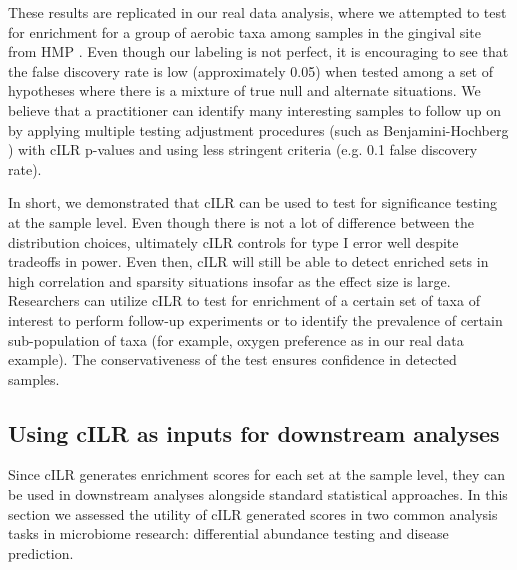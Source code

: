 \documentclass{article}
\begin{document}
These results are replicated in our real data analysis, where we attempted to test for enrichment for a group of aerobic taxa among samples in the gingival site from HMP \cite{consortium2012}. Even though our labeling is not perfect, it is encouraging to see that the false discovery rate is low (approximately 0.05) when tested among a set of hypotheses where there is a mixture of true null and alternate situations. We believe that a practitioner can identify many interesting samples to follow up on by applying multiple testing adjustment procedures (such as Benjamini-Hochberg \cite{benjamini1995}) with cILR p-values and using less stringent criteria (e.g. 0.1 false discovery rate).  

In short, we demonstrated that cILR can be used to test for significance testing at the sample level. Even though there is not a lot of difference between the distribution choices, ultimately cILR controls for type I error well despite tradeoffs in power. Even then, cILR will still be able to detect enriched sets in high correlation and sparsity situations insofar as the effect size is large. Researchers can utilize cILR to test for enrichment of a certain set of taxa of interest to perform follow-up experiments or to identify the prevalence of certain sub-population of taxa (for example, oxygen preference as in our real data example). The conservativeness of the test ensures confidence in detected samples.  

\subsection*{Using cILR as inputs for downstream analyses}
Since cILR generates enrichment scores for each set at the sample level, they can be used in downstream analyses alongside standard statistical approaches. In this section we assessed the utility of cILR generated scores in two common analysis tasks in microbiome research: differential abundance testing and disease prediction.
\end{document}
